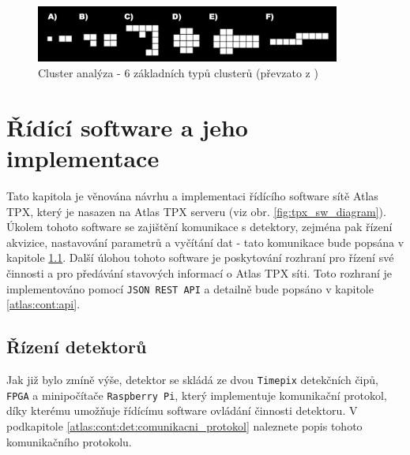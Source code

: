 \begin{figure}[t]
	\begin{center}
		\includegraphics[width=10cm]{figures/ca.png}
		\caption{Cluster analýza - 6 základních typů clusterů (převzato z \cite{TurecekThesis2011})}
		\label{fig:tpx_ca}
	\end{center}
\end{figure}


\section{Řídící software a jeho implementace}\label{atlas:cont}
Tato kapitola je věnována návrhu a implementaci řídícího software sítě Atlas TPX, který je nasazen na Atlas TPX serveru (viz obr. \ref{fig:tpx_sw_diagram}). Úkolem  tohoto software se zajištění komunikace s detektory, zejména pak řízení akvizice, nastavování parametrů a vyčítání dat - tato komunikace bude popsána v kapitole \ref{atlas:cont:det}. Další úlohou tohoto software je poskytování rozhraní pro řízení své činnosti a pro předávání stavových informací o Atlas TPX síti. Toto rozhraní je implementováno pomocí \texttt{JSON REST API} a detailně bude popsáno v kapitole \ref{atlas:cont:api}. \todo

\subsection{Řízení detektorů}\label{atlas:cont:det} %
Jak již bylo zmíně výše, detektor se skládá ze dvou \texttt{Timepix} detekčních čipů, \texttt{FPGA} a minipočítače \texttt{Raspberry Pi}, který implementuje komunikační protokol, díky kterému umožňuje řídícímu software ovládání činnosti detektoru. V podkapitole \ref{atlas:cont:det:comunikacni_protokol} naleznete popis tohoto komunikačního protokolu.

